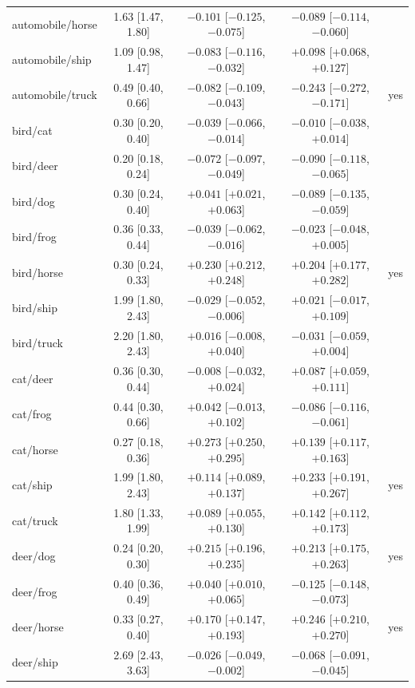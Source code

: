 \begin{table}[h]
\begin{tabular}{lcccc}
automobile/horse & 1.63 [1.47, 1.80] & $-0.101$ [$-0.125$, $-0.075$] & $-0.089$ [$-0.114$, $-0.060$] &  \\
automobile/ship & 1.09 [0.98, 1.47] & $-0.083$ [$-0.116$, $-0.032$] & $+0.098$ [$+0.068$, $+0.127$] &  \\
automobile/truck & 0.49 [0.40, 0.66] & $-0.082$ [$-0.109$, $-0.043$] & $-0.243$ [$-0.272$, $-0.171$] & yes \\
bird/cat & 0.30 [0.20, 0.40] & $-0.039$ [$-0.066$, $-0.014$] & $-0.010$ [$-0.038$, $+0.014$] &  \\
bird/deer & 0.20 [0.18, 0.24] & $-0.072$ [$-0.097$, $-0.049$] & $-0.090$ [$-0.118$, $-0.065$] &  \\
bird/dog & 0.30 [0.24, 0.40] & $+0.041$ [$+0.021$, $+0.063$] & $-0.089$ [$-0.135$, $-0.059$] &  \\
bird/frog & 0.36 [0.33, 0.44] & $-0.039$ [$-0.062$, $-0.016$] & $-0.023$ [$-0.048$, $+0.005$] &  \\
bird/horse & 0.30 [0.24, 0.33] & $+0.230$ [$+0.212$, $+0.248$] & $+0.204$ [$+0.177$, $+0.282$] & yes \\
bird/ship & 1.99 [1.80, 2.43] & $-0.029$ [$-0.052$, $-0.006$] & $+0.021$ [$-0.017$, $+0.109$] &  \\
bird/truck & 2.20 [1.80, 2.43] & $+0.016$ [$-0.008$, $+0.040$] & $-0.031$ [$-0.059$, $+0.004$] &  \\
cat/deer & 0.36 [0.30, 0.44] & $-0.008$ [$-0.032$, $+0.024$] & $+0.087$ [$+0.059$, $+0.111$] &  \\
cat/frog & 0.44 [0.30, 0.66] & $+0.042$ [$-0.013$, $+0.102$] & $-0.086$ [$-0.116$, $-0.061$] &  \\
cat/horse & 0.27 [0.18, 0.36] & $+0.273$ [$+0.250$, $+0.295$] & $+0.139$ [$+0.117$, $+0.163$] &  \\
cat/ship & 1.99 [1.80, 2.43] & $+0.114$ [$+0.089$, $+0.137$] & $+0.233$ [$+0.191$, $+0.267$] & yes \\
cat/truck & 1.80 [1.33, 1.99] & $+0.089$ [$+0.055$, $+0.130$] & $+0.142$ [$+0.112$, $+0.173$] &  \\
deer/dog & 0.24 [0.20, 0.30] & $+0.215$ [$+0.196$, $+0.235$] & $+0.213$ [$+0.175$, $+0.263$] & yes \\
deer/frog & 0.40 [0.36, 0.49] & $+0.040$ [$+0.010$, $+0.065$] & $-0.125$ [$-0.148$, $-0.073$] &  \\
deer/horse & 0.33 [0.27, 0.40] & $+0.170$ [$+0.147$, $+0.193$] & $+0.246$ [$+0.210$, $+0.270$] & yes \\
deer/ship & 2.69 [2.43, 3.63] & $-0.026$ [$-0.049$, $-0.002$] & $-0.068$ [$-0.091$, $-0.045$] &  \\

\end{tabular}
\end{table}
